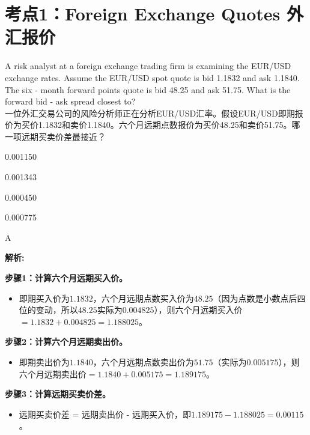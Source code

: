 \documentclass{article}
\newcounter{question} %
\newenvironment{explanation}
{\textbf{解析:}\par}
{\par}
\begin{document}
 \tableofcontents %
\newpage



\section{考点1：Foreign Exchange Quotes 外汇报价}
\setcounter{question}{0}
\begin{question}
    A risk analyst at a foreign exchange trading firm is examining the EUR/USD exchange rates. Assume the EUR/USD spot quote is bid 1.1832 and ask 1.1840. The six - month forward points quote is bid 48.25 and ask 51.75. What is the forward bid - ask spread closest to?\\
    一位外汇交易公司的风险分析师正在分析EUR/USD汇率。假设EUR/USD即期报价为买价1.1832和卖价1.1840。六个月远期点数报价为买价48.25和卖价51.75。哪一项远期买卖价差最接近？
    \end{question}
    
    \begin{choices}
        \item 0.001150
        \item 0.001343
        \item 0.000450
        \item 0.000775
    \end{choices}
    
    \begin{correctanswer}
    A
    \end{correctanswer}
    
    \begin{explanation}
    \textbf{步骤1：计算六个月远期买入价。}
    \begin{itemize}
    \item 即期买入价为\(1.1832\)，六个月远期点数买入价为\(48.25\)（因为点数是小数点后四位的变动，所以\(48.25\)实际为\(0.004825\)），则六个月远期买入价\( = 1.1832 + 0.004825 = 1.188025\)。
    \end{itemize}
    \textbf{步骤2：计算六个月远期卖出价。}
    \begin{itemize}
    \item 即期卖出价为\(1.1840\)，六个月远期点数卖出价为\(51.75\)（实际为\(0.005175\)），则六个月远期卖出价\( = 1.1840 + 0.005175 = 1.189175\)。
    \end{itemize}
    \textbf{步骤3：计算远期买卖价差。}
    \begin{itemize}
    \item 远期买卖价差 = 远期卖出价 - 远期买入价，即\(1.189175 - 1.188025 = 0.00115\)。
    \end{itemize}
    \end{explanation}
    
\end{document}
